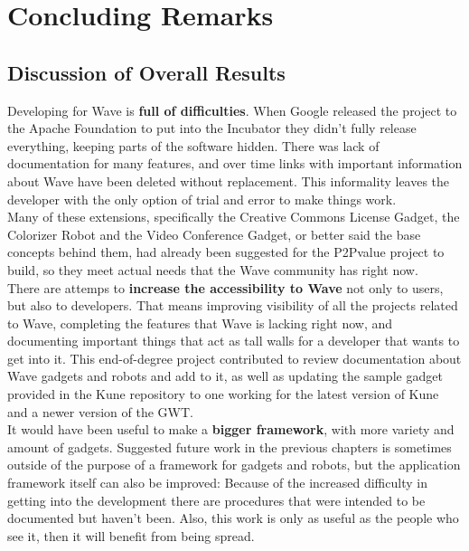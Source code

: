 \chapter{Concluding Remarks}
\section{Discussion of Overall Results}
Developing for Wave is \textbf{full of difficulties}. When Google released the project to the Apache Foundation to put into the Incubator they didn't fully release everything, keeping parts of the software hidden. There was lack of documentation for many features, and over time links with important information about Wave have been deleted without replacement. This informality leaves the developer with the only option of trial and error to make things work.\\[.2cm]
Many of these extensions, specifically the Creative Commons License Gadget, the Colorizer Robot and the Video Conference Gadget, or better said the base concepts behind them, had already been suggested for the P2Pvalue project to build, so they meet actual needs that the Wave community has right now.\\[.2cm]
There are attemps to \textbf{increase the accessibility to Wave} not only to users, but also to developers. That means improving visibility of all the projects related to Wave, completing the features that Wave is lacking right now, and documenting important things that act as tall walls for a developer that wants to get into it. This end-of-degree project contributed to review documentation about Wave gadgets and robots and add to it, as well as updating the sample gadget provided in the Kune repository to one working for the latest version of Kune and a newer version of the GWT.\\[.2cm]
It would have been useful to make a \textbf{bigger framework}, with more variety and amount of gadgets. Suggested future work in the previous chapters is sometimes outside of the purpose of a framework for gadgets and robots, but the application framework itself can also be improved: Because of the increased difficulty in getting into the development there are procedures that were intended to be documented but haven't been. Also, this work is only as useful as the people who see it, then it will benefit from being spread.

